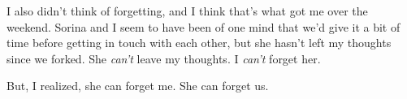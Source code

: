 I also didn't think of forgetting, and I think that's what got me over the weekend. Sorina and I seem to have been of one mind that we'd give it a bit of time before getting in touch with each other, but she hasn't left my thoughts since we forked. She \emph{can't} leave my thoughts. I \emph{can't} forget her.

But, I realized, she can forget me. She can forget us.
